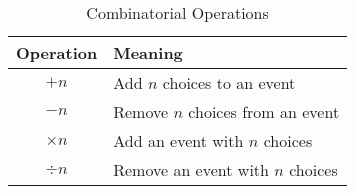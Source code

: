 \documentclass{article}
\begin{document}
    \begin{table}[h]
        \caption{Combinatorial Operations}
        \centering
        \begin{tabular}{cl}
            \toprule
            Operation & Meaning \\
            \midrule
            $+ n$ & Add $n$ choices to an event \\
            $- n$ & Remove $n$ choices from an event \\
            $\times n$ & Add an event with $n$ choices \\
            $\div n$ & Remove an event with $n$ choices \\
            \bottomrule
        \end{tabular}
    \end{table}
\end{document}
